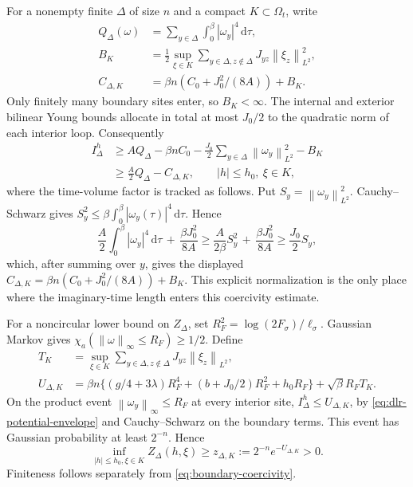 \documentclass[11pt]{article}
\numberwithin{equation}{section}
\theoremstyle{definition}
\newcommand{\dd}{\,\mathrm d}
\newcommand{\norm}[1]{\left\lVert#1\right\rVert}
\begin{document}
For a nonempty finite $\Delta$ of size $n$ and a compact $K\subset\Omega_t$,
write
\begin{align*}
 Q_\Delta(\omega)&=\sum_{y\in\Delta}\int_0^\beta|\omega_y|^4\dd\tau,\\
 B_K&=\tfrac12\sup_{\xi\in K}
           \sum_{y\in\Delta,z\notin\Delta}J_{yz}\norm{\xi_z}_{L^2}^2,\\
 C_{\Delta,K}&=\beta n(C_0+J_0^2/(8A))+B_K.
\end{align*}
Only finitely many boundary sites enter, so $B_K<\infty$.
The internal and exterior bilinear Young bounds allocate in total at most
$J_0/2$ to the quadratic norm of each interior loop.  Consequently
\begin{align}
 I_\Delta^h&\geq A Q_\Delta-\beta n C_0
                 -\tfrac{J_0}{2}\sum_{y\in\Delta}\norm{\omega_y}_{L^2}^2-B_K
 \nonumber\\
 &\geq\tfrac A2 Q_\Delta-C_{\Delta,K},
 \qquad |h|\leq h_0,\ \xi\in K,
 \label{eq:boundary-coercivity}
\end{align}
where the time-volume factor is tracked as follows.  Put
$S_y=\norm{\omega_y}_{L^2}^2$.  Cauchy--Schwarz gives
$S_y^2\leq\beta\int_0^\beta|\omega_y(\tau)|^4\dd\tau$.  Hence
\[
 \frac A2\int_0^\beta|\omega_y|^4\dd\tau
 \, + \, \frac{\beta J_0^2}{8A}
 \geq \frac{A}{2\beta}S_y^2
 \, + \, \frac{\beta J_0^2}{8A}
 \geq \frac{J_0}{2}S_y,
\]
which, after summing over $y$, gives the displayed
$C_{\Delta,K}=\beta n(C_0+J_0^2/(8A))+B_K$.  This explicit
normalization is the only place where the imaginary-time length enters this
coercivity estimate.

For a noncircular lower bound on $Z_\Delta$, set
$R_F^2=\log(2F_\sigma)/\ell_\sigma$.  Gaussian Markov gives
$\chi_a(\norm{\omega}_\infty\leq R_F)\geq1/2$.  Define
\begin{align*}
 T_K&=\sup_{\xi\in K}\sum_{y\in\Delta,z\notin\Delta}
                       J_{yz}\norm{\xi_z}_{L^2},\\
 U_{\Delta,K}&=\beta n\{(g/4+3\lambda)R_F^4
                       +(b+J_0/2)R_F^2+h_0R_F\}
                         +\sqrt\beta R_F T_K.
\end{align*}
On the product event $\norm{\omega_y}_\infty\leq R_F$ at every interior
site, $I_\Delta^h\leq U_{\Delta,K}$, by \eqref{eq:dlr-potential-envelope}
and Cauchy--Schwarz on the boundary terms.  This event has Gaussian probability
at least $2^{-n}$.  Hence
\begin{equation}
 \inf_{|h|\leq h_0,\xi\in K}Z_\Delta(h,\xi)
 \geq z_{\Delta,K}:=2^{-n}e^{-U_{\Delta,K}}>0.
 \label{eq:dlr-normalizer-lower}
\end{equation}
Finiteness follows separately from \eqref{eq:boundary-coercivity}.
\end{document}
